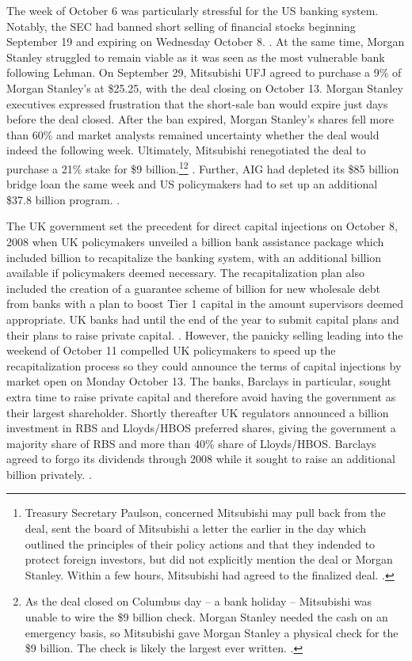 \documentclass[12pt]{article}
\begin{document}
The week of October 6 was particularly stressful for the US banking system. Notably, the SEC had banned short selling of financial stocks beginning September 19 and expiring on Wednesday October 8. \citep{shortban}. At the same time, Morgan Stanley struggled to remain viable as it was seen as the most vulnerable bank following Lehman. On September 29, Mitsubishi UFJ agreed to purchase a 9\% of Morgan Stanley's at \$25.25, with the deal closing on October 13. Morgan Stanley executives expressed frustration that the short-sale ban would expire just days before the deal closed. After the ban expired, Morgan Stanley's shares fell more than 60\% and market analysts remained uncertainty whether the deal would indeed the following week. Ultimately, Mitsubishi renegotiated the deal to purchase a 21\% stake for \$9 billion.\footnote{Treasury Secretary Paulson, concerned Mitsubishi may pull back from the deal, sent the board of Mitsubishi a letter the earlier in the day which outlined the principles of their policy actions and that they indended to protect foreign investors, but did not explicitly mention the deal or Morgan Stanley. Within a few hours, Mitsubishi had agreed to the finalized deal. \citep{paulsonbook}.}\footnote{As the deal closed on Columbus day -- a bank holiday -- Mitsubishi was unable to wire the \$9 billion check. Morgan Stanley needed the cash on an emergency basis, so Mitsubishi gave Morgan Stanley a physical check for the \$9 billion. The check is likely the largest ever written. \citep{Sorkin}.} \citep{MUFGMS}. Further, AIG had depleted its \$85 billion bridge loan the same week and US policymakers had to set up an additional \$37.8 billion program. \citep{Geithner}. 

The UK government set the precedent for direct capital injections on October 8, 2008 when UK policymakers unveiled a  billion bank assistance package which included  billion to recapitalize the banking system, with an additional  billion available if policymakers deemed necessary. The recapitalization plan also included the creation of a guarantee scheme of  billion for new wholesale debt from banks with a plan to boost Tier 1 capital in the amount supervisors deemed appropriate. UK banks had until the end of the year to submit capital plans and their plans to raise private capital. \citep{UKPlans}. However, the panicky selling leading into the weekend of October 11 compelled UK policymakers to speed up the recapitalization process so they could announce the terms of capital injections by market open on Monday October 13. The banks, Barclays in particular, sought extra time to raise private capital and therefore avoid having the government as their largest shareholder. Shortly thereafter UK regulators announced a  billion investment in RBS and Lloyds/HBOS preferred shares, giving the government a majority share of RBS and more than 40\% share of Lloyds/HBOS. Barclays agreed to forgo its dividends through 2008 while it sought to raise an additional  billion privately. \citep{UKActual}.
\end{document}
